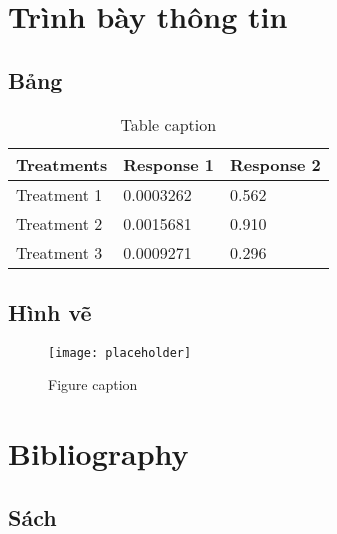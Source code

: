 \documentclass[11pt,fleqn]{book} %
\begin{document}


\chapter{Trình bày thông tin}

\section{Bảng}

\begin{table}[h]
\centering
\begin{tabular}{l l l}
\toprule
\textbf{Treatments} & \textbf{Response 1} & \textbf{Response 2}\\
\midrule
Treatment 1 & 0.0003262 & 0.562 \\
Treatment 2 & 0.0015681 & 0.910 \\
Treatment 3 & 0.0009271 & 0.296 \\
\bottomrule
\end{tabular}
\caption{Table caption}
\end{table}


\section{Hình vẽ}

\begin{figure}[h]
\centering\texttt{[image: placeholder]}
\caption{Figure caption}
\end{figure}


\chapter*{Bibliography}
\section*{Sách}
\printbibliography[heading=bibempty,type=book]
\end{document}
